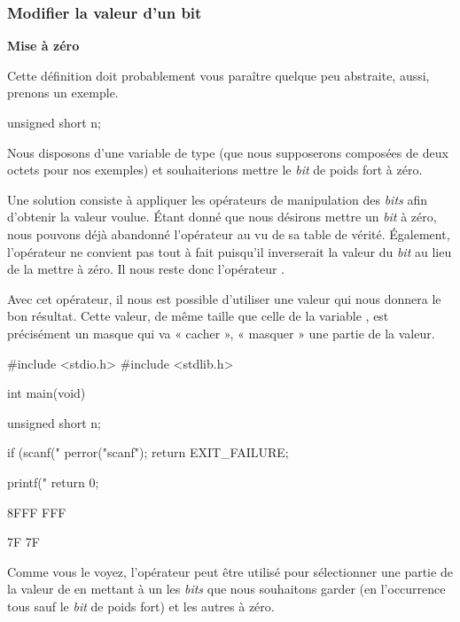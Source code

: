 \subsubsection{Modifier la valeur d'un bit}
\label{modifier-la-valeur-dun-bit}

\textbf{Mise à zéro}
\label{mise-a-zero}

Cette définition doit probablement vous paraître quelque peu abstraite,
aussi, prenons un exemple.

\begin{C}
unsigned short n;
\end{C}

Nous disposons d'une variable  de type
 (que nous supposerons composées de deux octets
pour nos exemples) et souhaiterions mettre le \emph{bit} de poids fort à
zéro.

Une solution consiste à appliquer les opérateurs de manipulation des
\emph{bits} afin d'obtenir la valeur voulue. Étant donné que nous
désirons mettre un \emph{bit} à zéro, nous pouvons déjà abandonné
l'opérateur \mybox{\textbar{}} au vu de sa table de vérité. Également,
l'opérateur \mybox{\^{}} ne convient pas tout à fait puisqu'il
inverserait la valeur du \emph{bit} au lieu de la mettre à zéro. Il nous
reste donc l'opérateur \mybox{\&}.

Avec cet opérateur, il nous est possible d'utiliser une valeur qui nous
donnera le bon résultat. Cette valeur, de même taille que celle de la
variable , est précisément un masque qui va « cacher », «
masquer » une partie de la valeur.

\begin{C}
#include <stdio.h>
#include <stdlib.h>


int main(void)
{
    unsigned short n;

    if (scanf("%
    {
        perror("scanf");
        return EXIT_FAILURE;
    }

    printf("%
    return 0;
}
\end{C}

\begin{C}
8FFF
FFF

7F
7F
\end{C}

Comme vous le voyez, l'opérateur \mybox{\&} peut être utilisé pour
sélectionner une partie de la valeur de  en mettant à un les
\emph{bits} que nous souhaitons garder (en l'occurrence tous sauf le
\emph{bit} de poids fort) et les autres à zéro.

